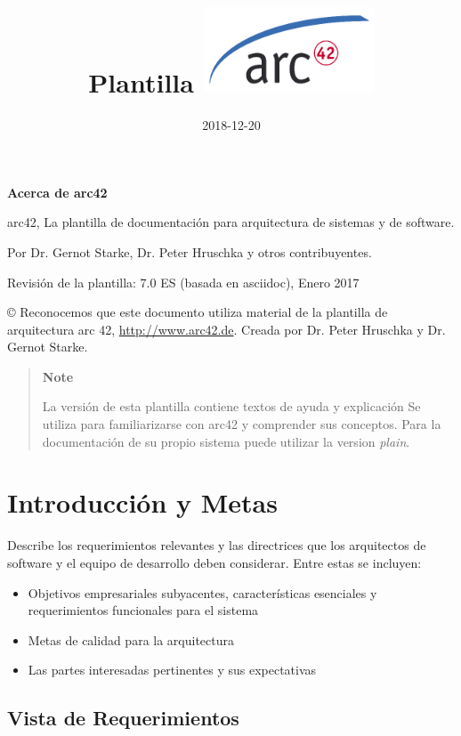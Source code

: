 \documentclass[]{article}
\title{Plantilla \includegraphics{images/arc42-logo.png}}
\date{2018-12-20}
\begin{document}
\maketitle

\section{}

\textbf{Acerca de arc42}

arc42, La plantilla de documentación para arquitectura de sistemas y de
software.

Por Dr. Gernot Starke, Dr. Peter Hruschka y otros contribuyentes.

Revisión de la plantilla: 7.0 ES (basada en asciidoc), Enero 2017

© Reconocemos que este documento utiliza material de la plantilla de
arquitectura arc 42, \url{http://www.arc42.de}. Creada por Dr. Peter
Hruschka y Dr. Gernot Starke.

\begin{quote}
\textbf{Note}

La versión de esta plantilla contiene textos de ayuda y explicación Se
utiliza para familiarizarse con arc42 y comprender sus conceptos. Para
la documentación de su propio sistema puede utilizar la version
\emph{plain}.
\end{quote}

\hypertarget{section-introduction-and-goals}{%
\section{Introducción y Metas}\label{section-introduction-and-goals}}

Describe los requerimientos relevantes y las directrices que los
arquitectos de software y el equipo de desarrollo deben considerar.
Entre estas se incluyen:

\begin{itemize}
\item
  Objetivos empresariales subyacentes, características esenciales y
  requerimientos funcionales para el sistema
\item
  Metas de calidad para la arquitectura
\item
  Las partes interesadas pertinentes y sus expectativas
\end{itemize}

\hypertarget{_vista_de_requerimientos}{%
\subsection{Vista de Requerimientos}\label{_vista_de_requerimientos}}
\end{document}
